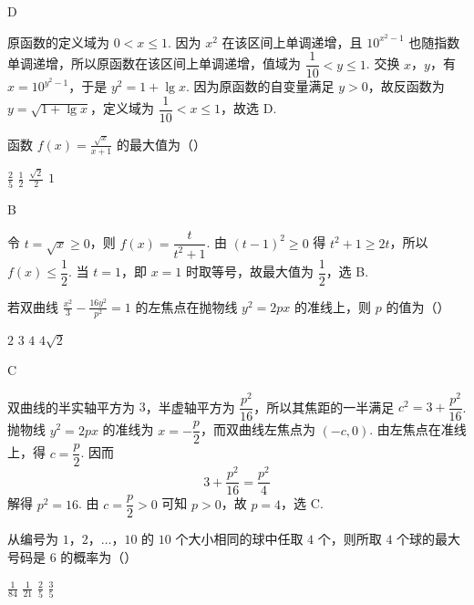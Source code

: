 \begin{answer}
D
\end{answer}

\begin{solution}
原函数的定义域为 \(0<x\leqslant1\). 因为 \(x^{2}\) 在该区间上单调递增，且 \(10^{x^{2}-1}\) 也随指数单调递增，所以原函数在该区间上单调递增，值域为 \(\dfrac{1}{10}<y\leqslant1\). 交换 \(x\)，\(y\)，有 \(x=10^{y^{2}-1}\)，于是 \(y^{2}=1+\lg x\). 因为原函数的自变量满足 \(y>0\)，故反函数为 \(y=\sqrt{1+\lg x}\)，定义域为 \(\dfrac{1}{10}<x\leqslant1\)，故选 D.
\end{solution}

\begin{problem}
函数 \( f(x) = \frac{\sqrt{x}}{x + 1} \) 的最大值为（\quad）

\choices
    {\( \frac{2}{5} \)}
    {\( \frac{1}{2} \)}
    {\( \frac{\sqrt{2}}{2} \)}
    {\(1\)}
\end{problem}

\begin{answer}
B
\end{answer}

\begin{solution}
令 \(t=\sqrt{x}\geqslant0\)，则 \(f(x)=\dfrac{t}{t^{2}+1}\). 由 \((t-1)^{2}\geqslant0\) 得 \(t^{2}+1\geqslant2t\)，所以 \(f(x)\leqslant\dfrac12\). 当 \(t=1\)，即 \(x=1\) 时取等号，故最大值为 \(\dfrac12\)，选 B.
\end{solution}

\begin{problem}
若双曲线 \(\frac{x^2}{3} - \frac{16y^2}{p^2} = 1\) 的左焦点在抛物线 \(y^2 = 2px\) 的准线上，则 \(p\) 的值为（\quad）

\choices
    {\(2\)}
    {\(3\)}
    {\(4\)}
    {\(4 \sqrt{2}\)}
\end{problem}

\begin{answer}
C
\end{answer}

\begin{solution}
双曲线的半实轴平方为 \(3\)，半虚轴平方为 \(\dfrac{p^{2}}{16}\)，所以其焦距的一半满足 \(c^{2}=3+\dfrac{p^{2}}{16}\). 抛物线 \(y^{2}=2px\) 的准线为 \(x=-\dfrac{p}{2}\)，而双曲线左焦点为 \((-c,0)\). 由左焦点在准线上，得 \(c=\dfrac{p}{2}\). 因而
\[
3+\frac{p^{2}}{16}=\frac{p^{2}}{4}
\]
解得 \(p^{2}=16\). 由 \(c=\dfrac{p}{2}>0\) 可知 \(p>0\)，故 \(p=4\)，选 C.
\end{solution}

\begin{problem}
从编号为 \(1\)，\(2\)，\(\ldots\)，\(10\) 的 \(10\) 个大小相同的球中任取 \(4\) 个，则所取 \(4\) 个球的最大号码是 \(6\) 的概率为（\quad）

\choices
    {\( \frac{1}{84} \)}
    {\( \frac{1}{21} \)}
    {\( \frac{2}{5} \)}
    {\( \frac{3}{5} \)}
\end{problem}

